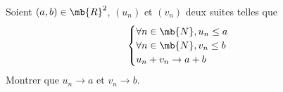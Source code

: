 \exercice

Soient $(a,b) \in \mb{R}^{2}$, $(u_{n})$ et $(v_{n})$ deux suites telles que
\begin{equation*}
    \begin{cases}
        \forall n \in \mb{N}, u_n \leq a \\
        \forall n \in \mb{N}, v_n \leq b \\
        u_n + v_n \to a + b
    \end{cases}
\end{equation*}
Montrer que $u_{n} \to a$ et $v_{n} \to b$.





